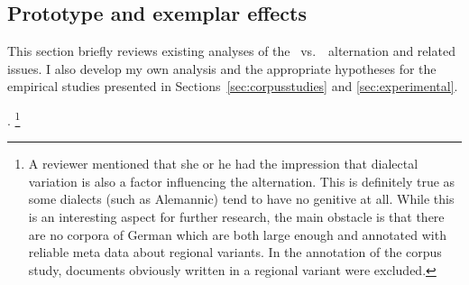 \subsection{Prototype and exemplar effects}
\label{sec:analyses}

This section briefly reviews existing analyses of the \PGCa\ vs.\ \NACa\ alternation and related issues.
I also develop my own analysis and the appropriate hypotheses for the empirical studies presented in Sections~\ref{sec:corpusstudies} and \ref{sec:experimental}.




.%
\footnote{A reviewer mentioned that she or he had the impression that dialectal variation is also a factor influencing the alternation.
This is definitely true as some dialects (such as Alemannic) tend to have no genitive at all.
While this is an interesting aspect for further research, the main obstacle is that there are no corpora of German which are both large enough and annotated with reliable meta data about regional variants.
In the annotation of the corpus study, documents obviously written in a regional variant were excluded.
}



